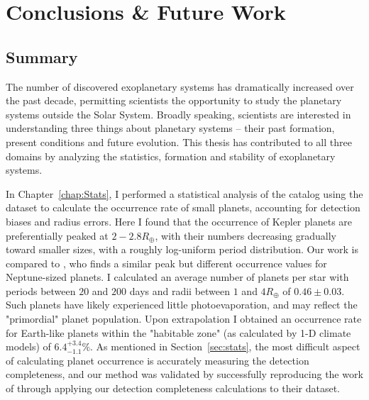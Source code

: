 \chapter{Conclusions \& Future Work}
\section{Summary}
The number of discovered exoplanetary systems has dramatically increased over the past decade, permitting scientists the opportunity to study the planetary systems outside the Solar System. 
Broadly speaking, scientists are interested in understanding three things about planetary systems -- their past formation, present conditions and future evolution. 
This thesis has contributed to all three domains by analyzing the statistics, formation and stability of exoplanetary systems. 

In Chapter~\ref{chap:Stats}, I performed a statistical analysis of the \kep catalog using the \citet{Ramirez2014} dataset to calculate the occurrence rate of small planets, accounting for detection biases and radius errors. 
Here I found that the occurrence of Kepler planets are preferentially peaked at $2-2.8R_\oplus$, with their numbers decreasing gradually toward smaller sizes, with a roughly log-uniform period distribution.
Our work is compared to \citet{Petigura2013}, who finds a similar peak but different occurrence values for Neptune-sized planets. 
I calculated an average number of planets per star with periods between $20$ and $200$ days and radii between $1$ and $4R_\oplus$ of $0.46 \pm 0.03$. 
Such planets have likely experienced little photoevaporation, and may reflect the "primordial" planet population. 
Upon extrapolation I obtained an occurrence rate for Earth-like planets within the "habitable zone" (as calculated by 1-D climate models) of $6.4^{+3.4}_{-1.1}\%$. 
As mentioned in Section~\ref{sec:stats}, the most difficult aspect of calculating planet occurrence is accurately measuring the detection completeness, and our method was validated by successfully reproducing the work of \citet{Petigura2013} through applying our detection completeness calculations to their dataset.

